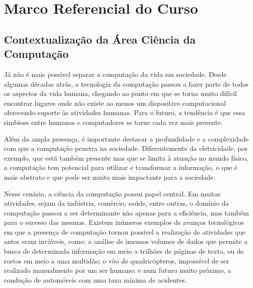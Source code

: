 \chapter{Marco Referencial do Curso}\label{sec:marco_referencial}



\section{Contextualização da Área Ciência da Computação}


Já não é mais possível separar a computação da vida em sociedade. Desde algumas décadas atrás, a tecnologia da computação passou a fazer parte de todos os aspectos da vida humana, chegando ao ponto em que se torna muito difícil encontrar lugares onde não existe ao menos um dispositivo computacional oferecendo suporte às atividades humanas. Para o futuro, a tendência é que essa simbiose entre humanos e computadores se torne cada vez mais presente.

Além da ampla presença, é importante destacar a profundidade e a complexidade com que a computação penetra na sociedade. Diferentemente da eletricidade, por exemplo, que está também presente mas que se limita à atuação no mundo físico, a computação tem potencial para utilizar e transformar a informação, o que é mais abstrato e que pode ser muito mais impactante para a sociedade.

Nesse cenário, a ciência da computação possui papel central. Em muitas atividades, sejam da indústria, comércio, saúde, entre outras, o domínio da computação passou a ser determinante não apenas para a eficiência, mas também para o sucesso das mesmas. Existem inúmeros exemplos de avanços tecnológicos em que a presença de computação tornou possível a realização de atividades que antes eram inviáveis, como: a análise de imensos volumes de dados que permite a busca de determinada informação em meio a trilhões de páginas de texto, ou de rostos em meio a uma multidão; o vôo de quadricópteros, impossível de ser realizado manualmente por um ser humano; e num futuro muito próximo, a condução de automóveis com uma taxa mínima de acidentes.

